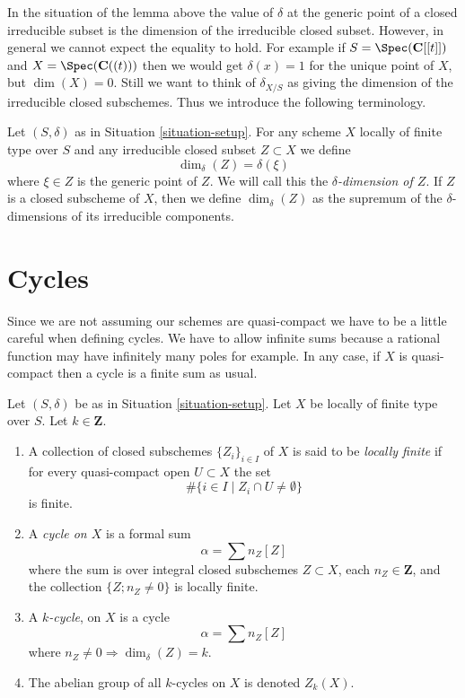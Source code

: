 \noindent
In the situation of the lemma above the
value of $\delta$ at the generic point of a closed irreducible subset
is the dimension of the irreducible closed subset.
However, in general we cannot expect the equality to hold.
For example if $S = \Spec(\mathbf{C}[[t]])$ and
$X = \Spec(\mathbf{C}((t)))$ then we would get
$\delta(x) = 1$ for the unique point of $X$, but $\dim(X) = 0$.
Still we want to think of $\delta_{X/S}$ as giving the
dimension of the irreducible closed subschemes. Thus we introduce
the following terminology.

\begin{definition}
\label{definition-delta-dimension}
Let $(S, \delta)$ as in Situation \ref{situation-setup}.
For any scheme $X$ locally of finite type over $S$
and any irreducible closed subset $Z \subset X$ we define
$$
\dim_\delta(Z) = \delta(\xi)
$$
where $\xi \in Z$ is the generic point of $Z$.
We will call this the {\it $\delta$-dimension of $Z$}.
If $Z$ is a closed subscheme of $X$, then we define
$\dim_\delta(Z)$ as the supremum of the $\delta$-dimensions
of its irreducible components.
\end{definition}







\section{Cycles}
\label{section-cycles}

\noindent
Since we are not assuming our schemes are quasi-compact we have
to be a little careful when defining cycles. We have to allow
infinite sums because a rational function may have infinitely many
poles for example. In any case, if $X$ is quasi-compact then a
cycle is a finite sum as usual.

\begin{definition}
\label{definition-cycles}
Let $(S, \delta)$ be as in Situation \ref{situation-setup}.
Let $X$ be locally of finite type over $S$.
Let $k \in \mathbf{Z}$.
\begin{enumerate}
\item A collection of closed subschemes $\{Z_i\}_{i \in I}$ of $X$
is said to be {\it locally finite} if for every quasi-compact open
$U \subset X$ the set
$$
\# \{i\in I \mid Z_i \cap U \not = \emptyset\}
$$
is finite.
\item A {\it cycle on $X$} is a formal sum
$$
\alpha = \sum n_Z [Z]
$$
where the sum is over integral closed subschemes $Z \subset X$,
each $n_Z \in \mathbf{Z}$, and the collection
$\{Z; n_Z \not = 0\}$ is locally finite.
\item A {\it $k$-cycle}, on $X$ is
a cycle
$$
\alpha = \sum n_Z [Z]
$$
where $n_Z \not = 0 \Rightarrow \dim_\delta(Z) = k$.
\item The abelian group of all $k$-cycles on $X$ is denoted $Z_k(X)$.
\end{enumerate}
\end{definition}

